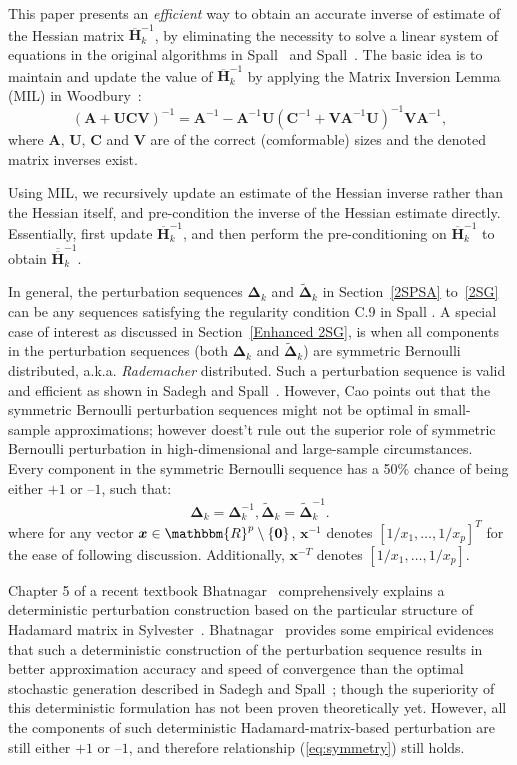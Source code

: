 \documentclass[conference]{IEEEtran}
\newcommand{\bDelta}{\bm{\Delta}}
\newcommand{\oH}{\bm{\overline{H}}}
\newcommand{\ooH}{\bm{\overline{\overline{H}}}}
\newcommand{\tDelta}{\bm{\tilde{\Delta}}}
\begin{document}
This paper presents an \textit{efficient} way to obtain an accurate inverse of
estimate of the Hessian matrix $\oH_k^{-1}$, by eliminating the necessity to solve a
linear system of equations in the original algorithms in Spall~\cite{Spall2000} and Spall~\cite{Spall2009}. The basic idea is to maintain and update the
value of $\oH_k^{-1}$ by applying the Matrix Inversion Lemma (MIL) in Woodbury~\cite{Woodbury1950}:
\begin{equation}
\label{eq:MatrixInversion}
(\bm{A}+\bm{UCV})^{-1}=\bm{A}^{-1}-\bm{A}^{-1}\bm{U}(\bm{C}^{-1}+\bm{V}\bm{A}^{-1}\bm{U})^{-1}\bm{V}\bm{A}^{-1},
\end{equation}
where $\bm{A}$, $\bm{U}$, $\bm{C}$ and $\bm{V}$
are of the correct (comformable) sizes and the denoted matrix inverses
exist.

Using MIL, we recursively update an estimate of the
Hessian inverse rather than the Hessian itself, and
pre-condition the inverse of the Hessian estimate directly. Essentially, first update $ \oH_k^{-1} $, and then
perform the pre-conditioning on $ \oH_k^{-1} $ to obtain $\ooH_k^{-1}$.

In general, the perturbation sequences $\bDelta_k$ and
$\tDelta_k$ in Section~\ref{2SPSA} to~\ref{2SG} can be any sequences
satisfying the regularity condition C.9 in Spall
\cite{Spall2009}. A special case of interest as discussed in
Section~\ref{Enhanced 2SG}, is when
all components in the perturbation sequences (both $ \bDelta_k $ and
$\tDelta_k $) are symmetric Bernoulli distributed,
a.k.a. \textit{Rademacher} distributed. Such a perturbation sequence
is valid and efficient as shown in Sadegh and Spall~\cite{Sadegh1998}. However, Cao \cite{Cao2011} points out that the symmetric Bernoulli perturbation sequences might not be optimal in small-sample approximations; however \cite{Cao2011} doest't rule out the superior role of symmetric Bernoulli perturbation in high-dimensional and large-sample circumstances. Every component in the symmetric Bernoulli sequence has a 50\% chance of being either $+1$ or
$\text{--}1$, such that:
\begin{equation} \label{eq:symmetry}
\bDelta_k=\bDelta_k^{-1}, \tDelta_k=\tDelta_k^{-1}.
\end{equation}
where for any vector
$ \bm{x}\in \mathbbm{R}^p \setminus \{\bm{0}\} $, 
$\bm{x}^{-1}$ denotes $[1/x_1, \ldots, 1/x_p]^T$ for the ease of following discussion. Additionally, $ \bm{x}^{-T} $ denotes $[1/x_1, \ldots, 1/x_p]$.

Chapter 5 of a recent textbook Bhatnagar~\cite{Bhatnagar2012} comprehensively explains a deterministic perturbation construction based on the particular structure of Hadamard matrix in Sylvester~\cite{Sylvester1867}. Bhatnagar~\cite{Bhatnagar2003} provides some empirical evidences that such a deterministic construction of the
perturbation sequence results in better approximation
accuracy and speed of convergence than the optimal stochastic
generation described in Sadegh and Spall~\cite{Sadegh1998}; though
the superiority of this deterministic formulation has not been proven theoretically yet. However, all the components of
such deterministic
Hadamard-matrix-based perturbation are still either $+1$ or $\text{--}1$,
and therefore relationship (\ref{eq:symmetry}) still holds.
\end{document}
